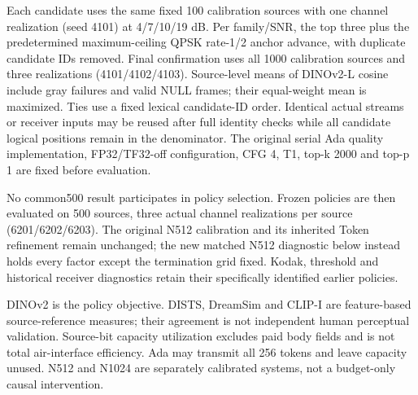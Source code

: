 \documentclass[10pt,letterpaper]{article}
\begin{document}
Each candidate uses the same fixed 100 calibration sources with one channel realization (seed 4101) at 4/7/10/19 dB. Per family/SNR, the top three plus the predetermined maximum-ceiling QPSK rate-1/2 anchor advance, with duplicate candidate IDs removed. Final confirmation uses all 1000 calibration sources and three realizations (4101/4102/4103). Source-level means of DINOv2-L cosine include gray failures and valid NULL frames; their equal-weight mean is maximized. Ties use a fixed lexical candidate-ID order. Identical actual streams or receiver inputs may be reused after full identity checks while all candidate logical positions remain in the denominator. The original serial Ada quality implementation, FP32/TF32-off configuration, CFG 4, T1, top-k 2000 and top-p 1 are fixed before evaluation.

No common500 result participates in policy selection. Frozen policies are then evaluated on 500 sources, three actual channel realizations per source (6201/6202/6203). The original N512 calibration and its inherited Token refinement remain unchanged; the new matched N512 diagnostic below instead holds every factor except the termination grid fixed. Kodak, threshold and historical receiver diagnostics retain their specifically identified earlier policies.




DINOv2 is the policy objective. DISTS, DreamSim and CLIP-I are feature-based source-reference measures; their agreement is not independent human perceptual validation. Source-bit capacity utilization excludes paid body fields and is not total air-interface efficiency. Ada may transmit all 256 tokens and leave capacity unused. N512 and N1024 are separately calibrated systems, not a budget-only causal intervention.
\end{document}
